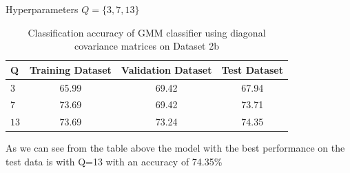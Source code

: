 \documentclass[11pt]{article}
\begin{document}
Hyperparameters $Q = \{3,7,13\}$
\begin{table}[h!]
\label{tab:tab1.1.1}
\begin{center}
\begin{tabular}{|l|c|c|c|}
\hline
\textbf{Q } & \textbf{Training Dataset} & \textbf{Validation Dataset} &\textbf{Test Dataset}\\
\hline
$3$ & 65.99 & 69.42 & 67.94\\
\hline
$7$ & 73.69  & 69.42 & 73.71\\
\hline
$13$ & 73.69 & 73.24 & 74.35\\
\hline
\end{tabular}
\caption{Classification accuracy of GMM classifier using diagonal covariance matrices on Dataset 2b}
\end{center}
\end{table}

As we can see from the table above the model with the best performance on the test data is with  Q=13 with an accuracy of 74.35\% 
\end{document}

